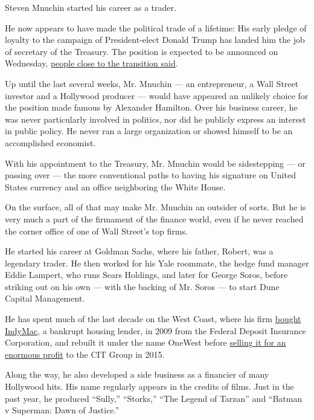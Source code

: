 Steven Mnuchin started his career as a trader.

He now appears to have made the political trade of a lifetime: His early
pledge of loyalty to the campaign of President-elect Donald Trump has
landed him the job of secretary of the Treasury. The position is
expected to be announced on Wednesday,
\href{http://www.nytimes.com/2016/11/29/us/politics/steven-terner-mnuchin-trump-treasury-secretary.html}{people
close to the transition said}.

Up until the last several weeks, Mr. Mnuchin --- an entrepreneur, a Wall
Street investor and a Hollywood producer --- would have appeared an
unlikely choice for the position made famous by Alexander Hamilton. Over
his business career, he was never particularly involved in politics, nor
did he publicly express an interest in public policy. He never ran a
large organization or showed himself to be an accomplished economist.

With his appointment to the Treasury, Mr. Mnuchin would be sidestepping
--- or passing over --- the more conventional paths to having his
signature on United States currency and an office neighboring the White
House.

On the surface, all of that may make Mr. Mnuchin an outsider of sorts.
But he is very much a part of the firmament of the finance world, even
if he never reached the corner office of one of Wall Street's top firms.

He started his career at Goldman Sachs, where his father, Robert, was a
legendary trader. He then worked for his Yale roommate, the hedge fund
manager Eddie Lampert, who runs Sears Holdings, and later for George
Soros, before striking out on his own --- with the backing of Mr. Soros
--- to start Dune Capital Management.

He has spent much of the last decade on the West Coast, where his firm
\href{http://www.nytimes.com/2009/01/04/business/worldbusiness/04iht-indymac.1.19066482.html}{bought
IndyMac}, a bankrupt housing lender, in 2009 from the Federal Deposit
Insurance Corporation, and rebuilt it under the name OneWest before
\href{http://dealbook.nytimes.com/2014/07/22/cit-to-buy-onewest-for-3-4-billion/}{selling
it for an enormous profit} to the CIT Group in 2015.

Along the way, he also developed a side business as a financier of many
Hollywood hits. His name regularly appears in the credits of films. Just
in the past year, he produced ``Sully,'' ``Storks,'' ``The Legend of
Tarzan'' and ``Batman v Superman: Dawn of Justice.''

